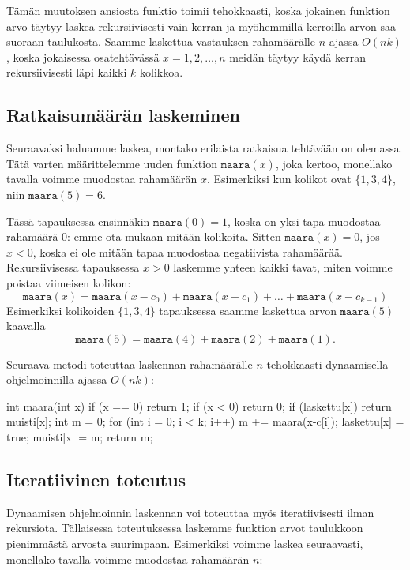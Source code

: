 Tämän muutoksen ansiosta funktio toimii tehokkaasti,
koska jokainen funktion arvo täytyy laskea rekursiivisesti vain kerran
ja myöhemmillä kerroilla arvon saa suoraan taulukosta.
Saamme laskettua vastauksen rahamäärälle $n$ ajassa $O(nk)$,
koska jokaisessa osatehtävässä
$x=1,2,\ldots,n$ meidän täytyy käydä kerran rekursiivisesti läpi
kaikki $k$ kolikkoa.

\subsection{Ratkaisumäärän laskeminen}

Seuraavaksi haluamme laskea, montako erilaista ratkaisua
tehtävään on olemassa.
Tätä varten määrittelemme uuden funktion $\texttt{maara}(x)$,
joka kertoo, monellako tavalla voimme muodostaa rahamäärän $x$.
Esimerkiksi kun kolikot ovat $\{1,3,4\}$, niin $\texttt{maara}(5)=6$.

Tässä tapauksessa ensinnäkin $\texttt{maara}(0)=1$, koska on yksi tapa
muodostaa rahamäärä $0$: emme ota mukaan mitään kolikoita.
Sitten $\texttt{maara}(x)=0$, jos $x<0$,
koska ei ole mitään tapaa muodostaa negatiivista rahamäärää.
Rekursiivisessa tapauksessa $x>0$ laskemme yhteen kaikki
tavat, miten voimme poistaa viimeisen kolikon:
\[
\texttt{maara}(x) =
    \texttt{maara}(x-c_0)+\texttt{maara}(x-c_1)+\dots+\texttt{maara}(x-c_{k-1})
\]
Esimerkiksi kolikoiden $\{1,3,4\}$ tapauksessa saamme laskettua
arvon $\texttt{maara}(5)$ kaavalla
\[
\texttt{maara}(5) =
    \texttt{maara}(4)+\texttt{maara}(2)+\texttt{maara}(1).
\]

Seuraava metodi toteuttaa laskennan rahamäärälle $n$
tehokkaasti dynaamisella ohjelmoinnilla ajassa $O(nk)$:

\begin{code}
int maara(int x) {
    if (x == 0) return 1;
    if (x < 0) return 0;
    if (laskettu[x]) return muisti[x];
    int m = 0;
    for (int i = 0; i < k; i++) {
        m += maara(x-c[i]);
    }
    laskettu[x] = true;
    muisti[x] = m;
    return m;
}
\end{code}

\subsection{Iteratiivinen toteutus}

Dynaamisen ohjelmoinnin laskennan voi toteuttaa myös iteratiivisesti
ilman rekursiota.
Tällaisessa toteutuksessa laskemme funktion arvot taulukkoon
pienimmästä arvosta suurimpaan.
Esimerkiksi voimme laskea seuraavasti, monellako tavalla
voimme muodostaa rahamäärän $n$:

